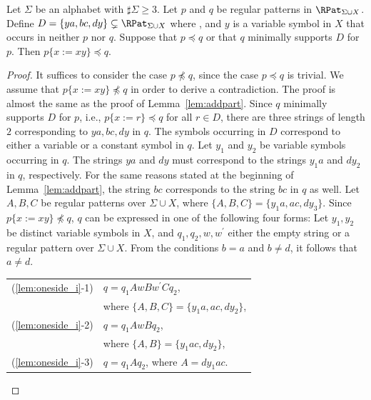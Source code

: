 \begin{lem}\label{lem:oneside_i}
{\color{black} 
Let $\Sigma$ be an alphabet with $\sharp\Sigma \ge 3$.
Let $p$ and $q$ be regular patterns in $\RPat_{\Sigma\cup X}$.
Define $D=\{ya,bc,dy\}\subsetneq \RPat_{\Sigma\cup X}$ where \TheConditionBComma, and $y$ is a variable symbol in $X$ that occurs in neither $p$ nor $q$.}
{\color{black} Suppose that $p\preceq q$ or that $q$ minimally supports $D$ for $p$.
 Then $p \{ x := xy \} \preceq q$}.
\end{lem}

\smallskip

\begin{proof}
{\color{black} It suffices to consider the case $p\not\preceq q$, since the case $p\preceq q$ is trivial.}
We assume that $p \{ x := xy \} \not \preceq q$ in order to derive a contradiction.
The proof is almost the same as the proof of Lemma~\ref{lem:addpart}.
{\color{black} Since $q$ minimally supports $D$ for $p$, i.e., $p \{ x := r \} \preceq q$ for all $r \in D$,}
there are three strings of length $2$ corresponding to $ya, bc, dy$ in $q$.
The symbols occurring in $D$ correspond to either a variable or a constant symbol in $q$.
Let $y_{1}$ and $y_{2}$ be variable symbols occurring in $q$.
The strings $ya$ and $dy$ must correspond to the strings $y_{1}a$ and $dy_{2}$ in $q$, respectively.
For the same reasons stated at the beginning of Lemma~\ref{lem:addpart}, the string $bc$ corresponds to the string $bc$ in $q$ as well.
Let $A,B,C$ be regular patterns {\color{black}over} $\Sigma \cup X$, where $\{ A,B,C \} = \{ y_{1}a,ac,dy_{3} \}$.
Since $p \{ x := xy \} \not \preceq q$, $q$ can be expressed in one of the following four forms:
Let $y_{1}, y_{2}$ be distinct variable symbols in $X$, and $q_{1}, q_{2}, w, w^{\prime}$ either the empty string or a regular pattern {\color{black}over} $\Sigma\cup X$.
From the conditions $b = a$ and $b \not= d$, it follows that $a \not= d$.

\smallskip

\begin{tabular}{ll}
(\ref{lem:oneside_i}-1) & $q=q_{1}AwBw^{\prime}Cq_{2}$,\\
& where $\{ A,B,C \} = \{ y_{1}a,ac,dy_{2} \}$,\\
(\ref{lem:oneside_i}-2) & $q=q_{1}AwBq_{2}$,\\
& where $\{ A,B \} = \{ y_{1}ac,dy_{2} \}$,\\
(\ref{lem:oneside_i}-3) & $q=q_{1}Aq_{2}$, where $A = dy_{1}ac$.
\end{tabular}


\end{proof}

